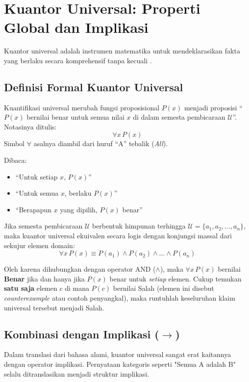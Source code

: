 \section{Kuantor Universal: Properti Global dan Implikasi}

Kuantor universal adalah instrumen matematika untuk mendeklarasikan fakta yang berlaku secara komprehensif tanpa kecuali \cite{rosen2019}.

\subsection{Definisi Formal Kuantor Universal}

\begin{definisi}
Kuantifikasi universal merubah fungsi proposisional $P(x)$ menjadi proposisi ``$P(x)$ bernilai benar untuk semua nilai $x$ di dalam semesta pembicaraan $\mathcal{U}$''. Notasinya ditulis:
\[ \forall x \, P(x) \]
Simbol $\forall$ asalnya diambil dari huruf ``A'' tebalik (\textit{All}).
\end{definisi}

Dibaca:
\begin{itemize}
    \item ``Untuk setiap $x$, $P(x)$''
    \item ``Untuk semua $x$, berlaku $P(x)$''
    \item ``Berapapun $x$ yang dipilih, $P(x)$ benar''
\end{itemize}

Jika semesta pembicaraan $\mathcal{U}$ berbentuk himpunan terhingga $\mathcal{U} = \{a_1, a_2, \ldots, a_n\}$, maka kuantor universal ekuivalen secara logis dengan konjungsi massal dari sekujur elemen domain:
\[ \forall x \, P(x) \equiv P(a_1) \land P(a_2) \land \ldots \land P(a_n) \]

Oleh karena dihubungkan dengan operator AND ($\land$), maka $\forall x \, P(x)$ bernilai \textbf{Benar} jika dan hanya jika $P(x)$ benar untuk \emph{setiap} elemen. Cukup temukan \textbf{satu saja} elemen $c$ di mana $P(c)$ bernilai Salah (elemen ini disebut \textit{counterexample} atau contoh penyangkal), maka runtuhlah keseluruhan klaim universal tersebut menjadi Salah.

\subsection{Kombinasi dengan Implikasi ($\rightarrow$)}

Dalam translasi dari bahasa alami, kuantor universal sangat erat kaitannya dengan operator implikasi. Pernyataan kategoris seperti "Semua A adalah B" selalu ditranslasikan menjadi struktur implikasi.

